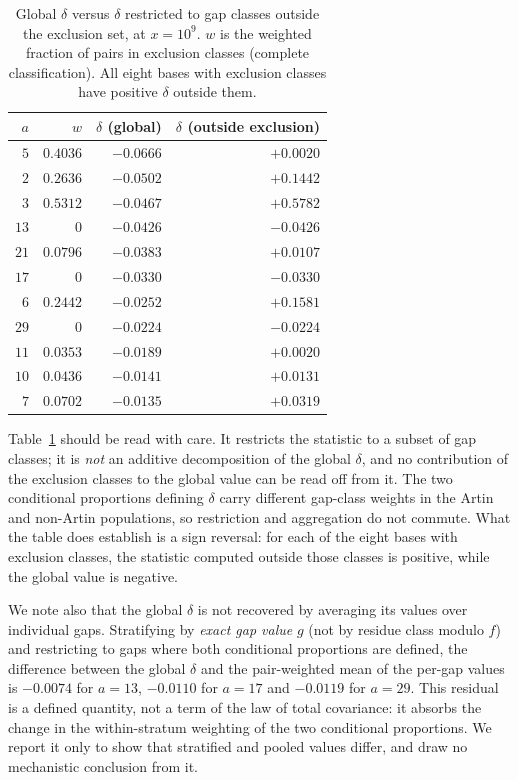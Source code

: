 \documentclass[11pt,reqno]{amsart}
\theoremstyle{plain}
\theoremstyle{definition}
\begin{document}
\begin{table}[t]
\centering
\caption{Global $\delta$ versus $\delta$ restricted to gap classes outside
the exclusion set, at $x = 10^9$. $w$ is the weighted fraction of pairs in
exclusion classes (complete classification). All eight bases with exclusion
classes have positive $\delta$ outside them.}
\label{tab:outside}
\begin{tabular}{rrrr}
\toprule
$a$ & $w$ & $\delta$ (global) & $\delta$ (outside exclusion) \\
\midrule
$5$  & $0.4036$ & $-0.0666$ & $+0.0020$ \\
$2$  & $0.2636$ & $-0.0502$ & $+0.1442$ \\
$3$  & $0.5312$ & $-0.0467$ & $+0.5782$ \\
$13$ & $0$      & $-0.0426$ & $-0.0426$ \\
$21$ & $0.0796$ & $-0.0383$ & $+0.0107$ \\
$17$ & $0$      & $-0.0330$ & $-0.0330$ \\
$6$  & $0.2442$ & $-0.0252$ & $+0.1581$ \\
$29$ & $0$      & $-0.0224$ & $-0.0224$ \\
$11$ & $0.0353$ & $-0.0189$ & $+0.0020$ \\
$10$ & $0.0436$ & $-0.0141$ & $+0.0131$ \\
$7$  & $0.0702$ & $-0.0135$ & $+0.0319$ \\
\bottomrule
\end{tabular}
\end{table}

Table~\ref{tab:outside} should be read with care. It restricts the statistic
to a subset of gap classes; it is \emph{not} an additive decomposition of the
global $\delta$, and no contribution of the exclusion classes to the global
value can be read off from it. The two conditional proportions defining
$\delta$ carry different gap-class weights in the Artin and non-Artin
populations, so restriction and aggregation do not commute. What the table
does establish is a sign reversal: for each of the eight bases with exclusion
classes, the statistic computed outside those classes is positive, while the
global value is negative.

We note also that the global $\delta$ is not recovered by averaging its
values over individual gaps. Stratifying by \emph{exact gap value} $g$ (not by
residue class modulo $f$) and restricting to gaps where both conditional
proportions are defined, the difference between the global $\delta$ and the
pair-weighted mean of the per-gap values is $-0.0074$ for $a = 13$, $-0.0110$
for $a = 17$ and $-0.0119$ for $a = 29$. This residual is a defined quantity,
not a term of the law of total covariance: it absorbs the change in the
within-stratum weighting of the two conditional proportions. We report it only
to show that stratified and pooled values differ, and draw no mechanistic
conclusion from it.
\end{document}
